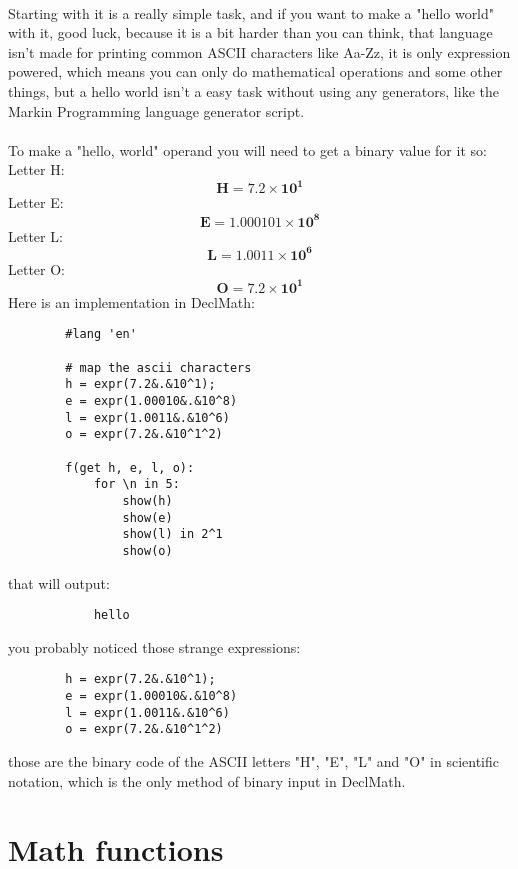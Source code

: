 \documentclass{book}
\begin{document}
    \paragraph{}
    Starting with it is a really simple task, and if you want to make a "hello world"
    with it, good luck, because it is a bit harder than you can think, that language isn't
    made for printing common ASCII characters like Aa-Zz, it is only expression powered,
    which means you can only do mathematical operations and some other things, but a hello world
    isn't a easy task without using any generators, like the Markin Programming language generator
    script.
    \paragraph{}
    To make a "hello, world" operand you will need to get a binary value for it
    so:
    Letter H:
    $$
    \mathbf{H} = \mathbf{7.2 \times 10^1}
    $$
Letter E: 
    $$
    \mathbf{E} = \mathbf{1.000101 \times 10^8}
    $$
Letter L:
$$
\mathbf{L} = \mathbf{1.0011 \times 10^6}
$$
Letter O: 
$$
\mathbf{O} = \mathbf{7.2 \times 10^1}
$$
Here is an implementation in DeclMath:

    \begin{lstlisting}
        #lang 'en'

        # map the ascii characters
        h = expr(7.2&.&10^1);
        e = expr(1.00010&.&10^8)
        l = expr(1.0011&.&10^6)
        o = expr(7.2&.&10^1^2)

        f(get h, e, l, o):
            for \n in 5:
                show(h)
                show(e)
                show(l) in 2^1
                show(o) 
    \end{lstlisting}

    that will output:
        \begin{lstlisting}
            hello
        \end{lstlisting}

    you probably noticed those strange expressions:
    \begin{lstlisting}
        h = expr(7.2&.&10^1);
        e = expr(1.00010&.&10^8)
        l = expr(1.0011&.&10^6)
        o = expr(7.2&.&10^1^2)
    \end{lstlisting}

    those are the binary code of the ASCII letters "H", "E", "L" and "O"
    in scientific notation, which is the only method of binary input in DeclMath.

    \section{Math functions}
\end{document}
